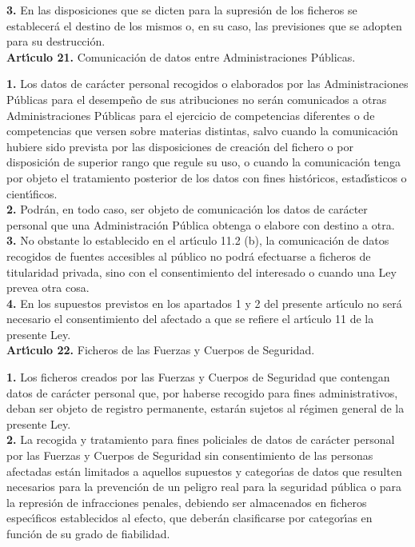 {\bf 3.} En las disposiciones que se dicten para la supresi\'on de los ficheros 
se establecer\'a el destino de los mismos o, en su caso, las previsiones que se 
adopten para su destrucci\'on.
\vspace{0.3cm}\\
{\large {\bf Art\'{\i}culo 21.} Comunicaci\'on de datos entre Administraciones 
P\'ublicas.}

{\bf 1.} Los datos de car\'acter personal recogidos o elaborados por las 
Administraciones P\'ublicas para el desempe\~no de sus atribuciones no ser\'an 
comunicados a otras Administraciones P\'ublicas para el ejercicio de 
competencias diferentes o de competencias que versen sobre materias distintas,
salvo cuando la comunicaci\'on hubiere sido prevista por las disposiciones de 
creaci\'on del fichero o por disposici\'on de superior rango que regule su uso,
o cuando la comunicaci\'on tenga por objeto el tratamiento posterior de los 
datos con fines hist\'oricos, estad\'{\i}sticos o cient\'{\i}ficos.\\

{\bf 2.} Podr\'an, en todo caso, ser objeto de comunicaci\'on los datos de 
car\'acter personal que una Administraci\'on P\'ublica obtenga o elabore con 
destino a otra.\\

{\bf 3.} No obstante lo establecido en el art\'{\i}culo 11.2 (b), la 
comunicaci\'on de datos recogidos de fuentes accesibles al p\'ublico no 
podr\'a efectuarse a ficheros de titularidad privada, sino con el 
consentimiento del interesado o cuando una Ley prevea otra cosa.\\

{\bf 4.} En los supuestos previstos en los apartados 1 y 2 del presente 
art\'{\i}culo no ser\'a necesario el consentimiento del afectado a que se 
refiere el art\'{\i}culo 11 de la presente Ley.
\vspace{0.3cm}\\
{\large {\bf Art\'{\i}culo 22.} Ficheros de las Fuerzas y Cuerpos de Seguridad.}

{\bf 1.} Los ficheros creados por las Fuerzas y Cuerpos de Seguridad que 
contengan datos de car\'acter personal que, por haberse recogido para fines 
administrativos, deban ser objeto de registro permanente, estar\'an sujetos al 
r\'egimen general de la presente Ley.\\

{\bf 2.} La recogida y tratamiento para fines policiales de datos de car\'acter 
personal por las Fuerzas y Cuerpos de Seguridad sin consentimiento de las 
personas afectadas est\'an limitados a aquellos supuestos y categor\'{\i}as de 
datos que resulten necesarios para la prevenci\'on de un peligro real para la 
seguridad p\'ublica o para la represi\'on de infracciones penales, debiendo ser 
almacenados en ficheros espec\'{\i}ficos establecidos al efecto, que deber\'an 
clasificarse por categor\'{\i}as en funci\'on de su grado de fiabilidad.\\

